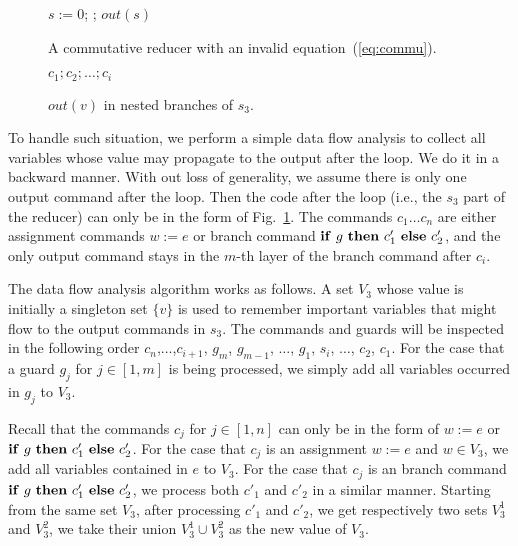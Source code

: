 \documentclass{llncs}
\newcommand{\cur}{cur()}
\newcommand{\ite}[3]{
	 \ifmmode 
	 \mathbf{if}\ #1 \ \mathbf{then}\ #2\  \mathbf{else}\ #3 
	 \else
	 \textbf{if}\ #1 \ \textbf{then}\ #2\  \textbf{else}\ #3
	 \fi}
\begin{document}
\begin{figure}[t]
	\begin{minipage}{0.4\textwidth}
		\begin{algorithm}[H]
			$s:= 0$; \;
			\Loop{}{
				$t:=\cur$;
				$s:= s + t$\;
			};
			$out(s)$\;
		\end{algorithm}
		\caption{A commutative reducer with an invalid equation~(\ref{eq:commu}).}
		\label{fig:reducer_opt}
	\end{minipage}
	\begin{minipage}{0.5\textwidth}
		\begin{algorithm}[H]
			$c_1;c_2;\ldots;c_i$\;
			\lElse{ $\ldots$}
		\end{algorithm}
		\caption{$out(v)$ in nested branches of $s_3$.}
		\label{fig:nested_out}
	\end{minipage}
\end{figure}




To handle such situation, we perform a simple data flow analysis to collect all variables whose value may propagate to the output after the loop. We do it in a backward manner.  With out loss of generality, we assume there is only one output command after the loop. Then the code after the loop (i.e., the $s_3$ part of the reducer) can only be in the form of Fig.~\ref{fig:nested_out}.
The commands $c_1\ldots c_n$ are either assignment commands $w:=e$ or branch command $\ite{g}{c'_1}{c'_2}$, and the only output command stays in the $m$-th layer of the branch command after $c_i$.

The data flow analysis algorithm works as follows.
A set $V_3$ whose value is initially a singleton set $\{v\}$ is used to remember important variables that might flow to the output commands in $s_3$.
The commands and guards will be inspected in the following order $c_{n}$,$\ldots$,$c_{i+1}$, $g_m$, $g_{m-1}$, $\ldots$, $g_1$, $s_i$, $\ldots$, $c_2$, $c_1$. For the case that a guard $g_j$ for $j\in [1,m]$ is being processed, we simply add all variables occurred in $g_j$ to $V_3$. 

Recall that the commands $c_j$ for $j\in [1,n]$ can only be in the form of $w:=e$ or $\ite{g}{c'_1}{c'_2}$.
For the case that $c_j$ is an assignment $w:=e$ and $w\in V_3$, we add all variables contained in $e$ to $V_3$. For the case that $c_j$ is an branch command $\ite{g}{c'_1}{c'_2}$, we process both $c'_1$ and $c'_2$ in a similar manner. Starting from the same set $V_3$,  after processing $c'_1$ and $c'_2$, we get respectively two sets $V_3^1$ and $V_3^2$, we take their union $V_3^1\cup V_3^2$ as the new value of $V_3$. 
\end{document}
